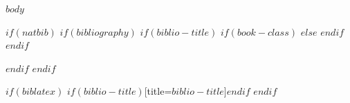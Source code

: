 \documentclass[
    $if(fontsize)$$fontsize$$else$10pt$endif$,
    $if(papersize)$$papersize$$else$letterpaper$endif$,
    titlepage,
    oneside,
    openright,
    $if(draft)$draft$else$final$endif$,
    article]{memoir}
\begin{document}


\mainmatter
$body$

\appendix

\backmatter

$if(natbib)$
    $if(bibliography)$
        $if(biblio-title)$
            $if(book-class)$
                \renewcommand\bibname{$biblio-title$}
            $else$
                \renewcommand\refname{$biblio-title$}
            $endif$
        $endif$
        
    $endif$
$endif$

$if(biblatex)$
    \printbibliography$if(biblio-title)$[title=$biblio-title$]$endif$
$endif$


\end{document}
